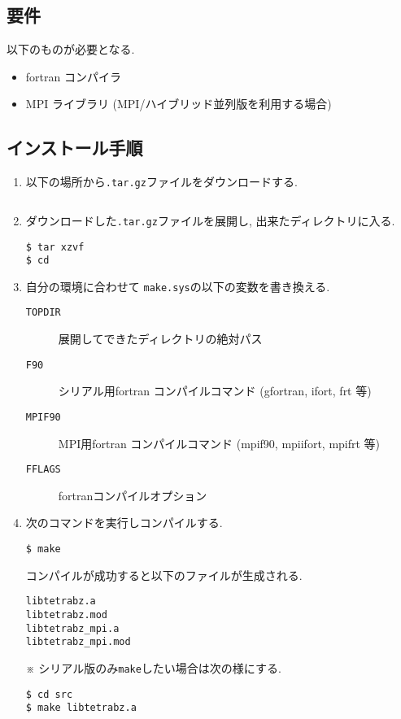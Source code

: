 \documentclass[12pt]{jarticle}
\begin{document}
\subsection{要件}

以下のものが必要となる.
\begin{itemize}
\item fortran コンパイラ
\item MPI ライブラリ (MPI/ハイブリッド並列版を利用する場合)
\end{itemize}

\subsection{インストール手順}

\begin{enumerate}

\item 以下の場所から\verb|.tar.gz|ファイルをダウンロードする.
\begin{verbatim}

\end{verbatim}

\item ダウンロードした\verb|.tar.gz|ファイルを展開し, 
出来たディレクトリに入る. 
\begin{verbatim}
$ tar xzvf 
$ cd 
\end{verbatim}

\item 自分の環境に合わせて
\verb|make.sys|の以下の変数を書き換える.
\begin{description}
\item[\texttt{TOPDIR}] 展開してできたディレクトリの絶対パス
\item[\texttt{F90}] シリアル用fortran コンパイルコマンド (gfortran, ifort, frt 等)
\item[\texttt{MPIF90}] MPI用fortran コンパイルコマンド (mpif90, mpiifort, mpifrt 等)
\item[\texttt{FFLAGS}] fortranコンパイルオプション
\end{description}

\item 次のコマンドを実行しコンパイルする. 
\begin{verbatim}
$ make 
\end{verbatim}
コンパイルが成功すると以下のファイルが生成される. 

\begin{verbatim}
libtetrabz.a
libtetrabz.mod
libtetrabz_mpi.a
libtetrabz_mpi.mod
\end{verbatim}

※ シリアル版のみ\verb|make|したい場合は次の様にする. 
\begin{verbatim}
$ cd src
$ make libtetrabz.a
\end{verbatim}
\end{enumerate}
\end{document}
